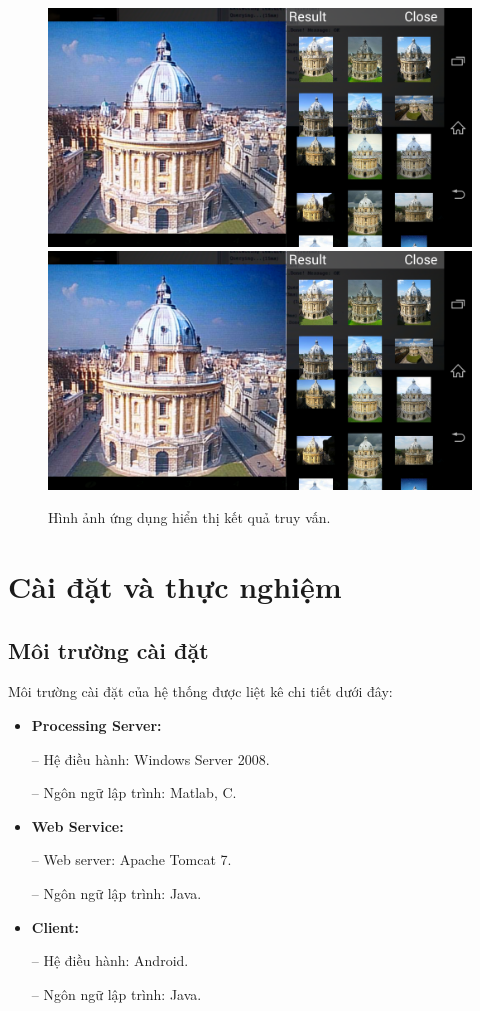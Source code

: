 \begin{figure}[!htbp]
  \begin{center}
    \leavevmode
    \ifpdf
      \includegraphics[scale=0.17]{result_capture}
    \else
      \includegraphics[scale=0.17]{result_capture}
    \fi
    \caption[Hình ảnh ứng dụng hiển thị kết quả truy vấn]{Hình ảnh ứng dụng hiển thị kết quả truy vấn.}
    \label{FigResultCapture}
  \end{center}
\end{figure}

\section{Cài đặt và thực nghiệm}
\label{c5-caidat}
	\subsection{Môi trường cài đặt}
	Môi trường cài đặt của hệ thống được liệt kê chi tiết dưới đây:
	
	\begin{itemize}
	\item \textbf{Processing Server:}
	
	-- Hệ điều hành: Windows Server 2008.
	
	-- Ngôn ngữ lập trình: Matlab, C.
	
	
	\item \textbf{Web Service:}
	
	-- Web server: Apache Tomcat 7.
	
	-- Ngôn ngữ lập trình: Java.
	
	
	\item \textbf{Client:}
	
	-- Hệ điều hành: Android.
	
	-- Ngôn ngữ lập trình: Java. 
	\end{itemize}	
	
